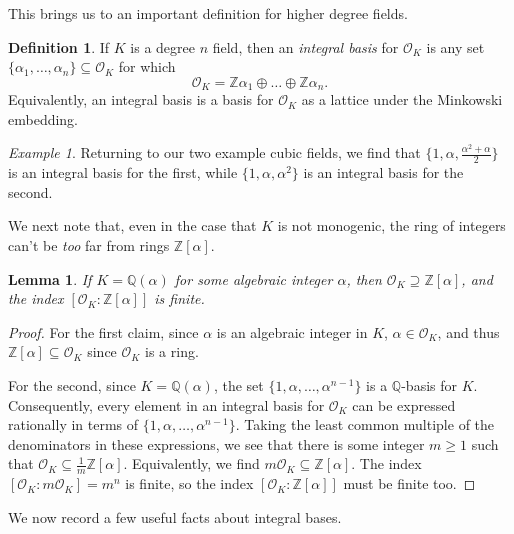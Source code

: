 \documentclass[12pt]{amsart}
\newtheorem{lemma}[theorem]{Lemma}
\theoremstyle{definition} \newtheorem*{notation}{Notation}
\theoremstyle{remark} \newtheorem*{remark}{Remark}
\theoremstyle{remark} \newtheorem*{example}{Example}
\theoremstyle{definition} \newtheorem*{definition}{Definition}
\numberwithin{equation}{section}
\numberwithin{theorem}{section}
\begin{document}
	This brings us to an important definition for higher degree fields.
	
	\begin{definition}
		If $K$ is a degree $n$ field, then an \emph{integral basis} for $\mathcal{O}_K$ is any set $\{\alpha_1,\dots,\alpha_n\} \subseteq \mathcal{O}_K$ for which
			\[
				\mathcal{O}_K = \mathbb{Z}\alpha_1 \oplus \dots \oplus \mathbb{Z}\alpha_n.
			\]
		Equivalently, an integral basis is a basis for $\mathcal{O}_K$ as a lattice under the Minkowski embedding.
	\end{definition}
	
	\begin{example}
		Returning to our two example cubic fields, we find that $\{1,\alpha, \frac{\alpha^2+\alpha}{2}\}$ is an integral basis for the first, while $\{1,\alpha,\alpha^2\}$ is an integral basis for the second.
	\end{example}
	
	We next note that, even in the case that $K$ is not monogenic, the ring of integers can't be \emph{too} far from rings $\mathbb{Z}[\alpha]$.
	
	\begin{lemma}
		If $K = \mathbb{Q}(\alpha)$ for some algebraic integer $\alpha$, then $\mathcal{O}_K \supseteq \mathbb{Z}[\alpha]$, and the index $[\mathcal{O}_K : \mathbb{Z}[\alpha]]$ is finite.
	\end{lemma}
	\begin{proof}
		For the first claim, since $\alpha$ is an algebraic integer in $K$, $\alpha \in \mathcal{O}_K$, and thus $\mathbb{Z}[\alpha] \subseteq \mathcal{O}_K$ since $\mathcal{O}_K$ is a ring.
		
		For the second, since $K = \mathbb{Q}(\alpha)$, the set $\{1,\alpha,\dots,\alpha^{n-1}\}$ is a $\mathbb{Q}$-basis for $K$.  Consequently, every element in an integral basis for $\mathcal{O}_K$ can be expressed rationally in terms of $\{1,\alpha,\dots,\alpha^{n-1}\}$.  Taking the least common multiple of the denominators in these expressions, we see that there is some integer $m \geq 1$ such that $\mathcal{O}_K \subseteq \frac{1}{m} \mathbb{Z}[\alpha]$.  Equivalently, we find $m \mathcal{O}_K \subseteq \mathbb{Z}[\alpha]$.  The index $[\mathcal{O}_K : m\mathcal{O}_K] = m^n$ is finite, so the index $[\mathcal{O}_K : \mathbb{Z}[\alpha]]$ must be finite too.
	\end{proof}
	
	We now record a few useful facts about integral bases.
	
\end{document}
